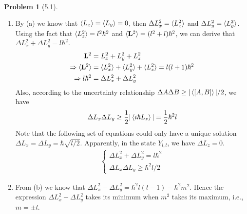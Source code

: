\documentclass[twoside,11pt]{article}
\theoremstyle{definition}
\newtheorem{problem}{Problem}
\theoremstyle{remark}
\begin{document}
\begin{problem}[5.1]
\begin{enumerate}[label=(\alph*)]
    \item By (a) we know that $\braket{L_x} = \braket{L_y}=0$, then $\Delta L_x^2 = \braket{L_x^2}$ 
    and $\Delta L_y^2 = \braket{L_y^2}$.
    Using the fact that $\braket{L_z^2} = l^2\hbar^2$ and $\braket{\mathbf{L}^2}=(l^2+l)\hbar^2$, we can derive that
    $\Delta L_x^2 + \Delta L_y^2=l\hbar^2$.
    \begin{align*}
        \mathbf{L}^2 &= L_x^2 + L_y^2 + L_z^2\\
        \Rightarrow
        \braket{\mathbf{L}^2} &= \braket{L_x^2} + \braket{L_y^2} + \braket{L_z^2} = l(l+1)\hbar^2  \\
        \Rightarrow l\hbar^2 &= \Delta L_x^2 + \Delta L_y^2
    \end{align*}
    Also, according to the uncertainty relationship $\Delta A\Delta B\geq |\braket{[A,B]}|/2$, we have
    \begin{align*}
        \Delta L_x\Delta L_y \geq \frac{1}{2} |\braket{i\hbar L_z}| = \frac{1}{2}\hbar^2l
    \end{align*}
    Note that the following set of equations could only have a unique solution
    $\Delta L_x=\Delta L_y=\hbar\sqrt{l/2}$.
    Apparently, in the state $Y_{l,l}$, we have $\Delta L_z = 0$.
    \begin{align*}
        \begin{cases}
            \Delta L_x^2 + \Delta L_y^2 = l\hbar^2\\
            \Delta L_x\Delta L_y \geq \hbar^2 l/2
        \end{cases}
    \end{align*}

    \item From (b) we know that $\Delta L_x^2 + \Delta L_y^2 = \hbar^2l(l-1) - \hbar^2m^2$.
    Hence the expression $\Delta L_x^2 + \Delta L_y^2$ takes its minimum when $m^2$ takes
    its maximum, i.e., $m=\pm l$.


\end{enumerate}
\end{problem}
\end{document}

